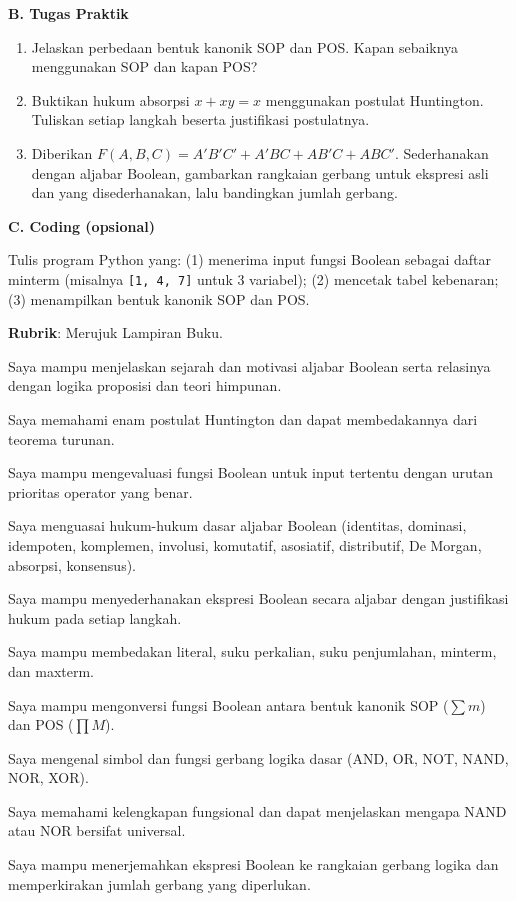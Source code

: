 \documentclass[../main]{subfiles}
\begin{document}
\begin{asesmen}
\textbf{B. Tugas Praktik}
\begin{enumerate}
  \item Jelaskan perbedaan bentuk kanonik SOP dan POS. Kapan sebaiknya menggunakan SOP dan kapan POS?
  \item Buktikan hukum absorpsi $x + xy = x$ menggunakan postulat Huntington. Tuliskan setiap langkah beserta justifikasi postulatnya.
  \item Diberikan $F(A,B,C) = A'B'C' + A'BC + AB'C + ABC'$. Sederhanakan dengan aljabar Boolean, gambarkan rangkaian gerbang untuk ekspresi asli dan yang disederhanakan, lalu bandingkan jumlah gerbang.
\end{enumerate}

\textbf{C. Coding (opsional)}

Tulis program Python yang: (1) menerima input fungsi Boolean sebagai daftar minterm (misalnya \texttt{[1, 4, 7]} untuk 3 variabel); (2) mencetak tabel kebenaran; (3) menampilkan bentuk kanonik SOP dan POS.

\textbf{Rubrik}: Merujuk Lampiran Buku.
\end{asesmen}


\begin{checklist}
  \item Saya mampu menjelaskan sejarah dan motivasi aljabar Boolean serta relasinya dengan logika proposisi dan teori himpunan.
  \item Saya memahami enam postulat Huntington dan dapat membedakannya dari teorema turunan.
  \item Saya mampu mengevaluasi fungsi Boolean untuk input tertentu dengan urutan prioritas operator yang benar.
  \item Saya menguasai hukum-hukum dasar aljabar Boolean (identitas, dominasi, idempoten, komplemen, involusi, komutatif, asosiatif, distributif, De Morgan, absorpsi, konsensus).
  \item Saya mampu menyederhanakan ekspresi Boolean secara aljabar dengan justifikasi hukum pada setiap langkah.
  \item Saya mampu membedakan literal, suku perkalian, suku penjumlahan, minterm, dan maxterm.
  \item Saya mampu mengonversi fungsi Boolean antara bentuk kanonik SOP ($\sum m$) dan POS ($\prod M$).
  \item Saya mengenal simbol dan fungsi gerbang logika dasar (AND, OR, NOT, NAND, NOR, XOR).
  \item Saya memahami kelengkapan fungsional dan dapat menjelaskan mengapa NAND atau NOR bersifat universal.
  \item Saya mampu menerjemahkan ekspresi Boolean ke rangkaian gerbang logika dan memperkirakan jumlah gerbang yang diperlukan.
\end{checklist}
\end{document}
